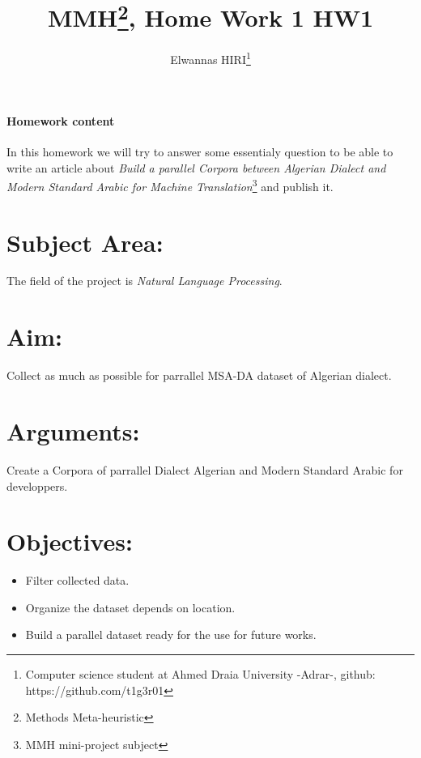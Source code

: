 \documentclass[12pt]{article}[]
\begin{document}
\title{MMH\thanks{Methods Meta-heuristic}, Home Work 1 HW1}
\author{Elwannas HIRI\thanks{Computer science student at Ahmed Draia University -Adrar-, github: https://github.com/t1g3r01}}
\maketitle
\paragraph{Homework content}
In this homework we will try to answer some essentialy question to be able to write an article about \textit{Build a  parallel Corpora between Algerian Dialect and Modern Standard Arabic for Machine Translation}\footnote{MMH mini-project subject} and publish it. 
\section{Subject Area:}
The field of the project is \textit{Natural Language Processing}.
\section{Aim:}
Collect as much as possible for parrallel MSA-DA dataset of Algerian dialect.
\section{Arguments:}
Create a Corpora of parrallel Dialect Algerian and Modern Standard Arabic for developpers.    
\section{Objectives:}
\begin{itemize}
	\item Filter collected data.	
	\item Organize the dataset depends on location. 
	\item Build a parallel dataset ready for the use for future works.	
\end{itemize}  
\end{document}
